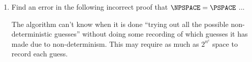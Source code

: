 \documentclass[usletter]{article}
\begin{document}
\begin{enumerate}
\begin{proof}
      Second, by Cook Levin we know that any language in $\NP^{\text{TQBF}}$ can be reduced to SAT in polynomial time. We also know that a linear time transformation to  exists for any $\psi \in$ SAT by appending existential quantifiers to the front of $\psi$. Then an appeal to the TQBF oracle can be made resulting in a polynomial time algorithm and we have that $\NP^{\text{TQBF}} \subseteq \P^{\text{TQBF}}$.

      TODO Show that $\NP^{\text{TQBF}}$ is not significantly different from $\NP$ so that Cook Levin still applies.

      \end{proof}

    \item Find an error in the following incorrect proof that $\NPSPACE = \PSPACE$ ...

      The algorithm can't know when it is done ``trying out all the possible non-deterministic guesses'' without doing some recording of which guesses it has made due to non-determinism. This may require as much as $2^{n^c}$ space to record each guess.

\end{enumerate}
\end{document}
